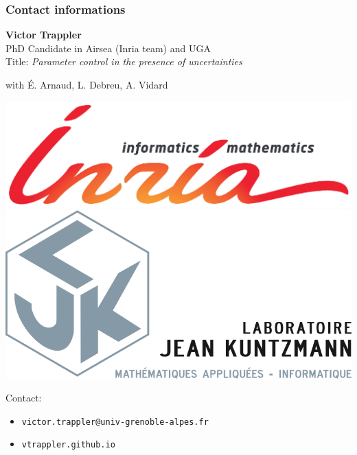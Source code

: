 \documentclass[11pt]{beamer}
\begin{document}
\begin{frame}[t]
  \frametitle{Contact informations}
  {\large \bf Victor Trappler} \hfill  \\
  PhD Candidate in Airsea (Inria team) and UGA \\
  Title: \emph{Parameter control in the presence of uncertainties}

  with É. Arnaud, L. Debreu, A. Vidard
  \begin{center}
\includegraphics[scale=0.20]{INRIA_SCIENTIFIQUE_UK_CMJN}
\includegraphics[scale=0.20]{ljk}
\end{center}

  Contact:
  \begin{itemize}
  \item \texttt{victor.trappler@univ-grenoble-alpes.fr}
  \item \texttt{vtrappler.github.io}
  \end{itemize}
  
\end{frame}




    
\end{document}
